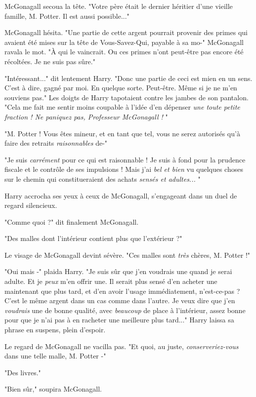 McGonagall secoua la tête. "Votre père était le dernier héritier d'une vieille famille, M. Potter. Il est aussi possible..."

McGonagall hésita. "Une partie de cette argent pourrait provenir des primes qui avaient été mises sur la tête de Vous-Savez-Qui, payable à sa mo-" McGonagall ravala le mot. "À qui le vaincrait. Ou ces primes n'ont peut-être pas encore été récoltées. Je ne suis pas sûre."

"Intéressant..." dit lentement Harry. "Donc une partie de ceci est mien en un sens. C'est à dire, gagné par moi. En quelque sorte. Peut-être. Même si je ne m'en souviens pas." Les doigts de Harry tapotaient contre les jambes de son pantalon. "Cela me fait me sentir moins coupable à l'idée d'en dépenser \emph{une toute petite fraction ! Ne paniquez pas, Professeur McGonagall !} "

"M. Potter ! Vous êtes mineur, et en tant que tel, vous ne serez autorisés qu'à faire des retraits \emph{raisonnables } de-"

"Je suis \emph{carrément}  pour ce qui est raisonnable ! Je suis à fond pour la prudence fiscale et le contrôle de ses impulsions ! Mais j'ai \emph{bel et bien}  vu quelques choses sur le chemin qui constitueraient des achats \emph{sensés et adultes...} "

Harry accrocha ses yeux à ceux de McGonagall, s'engageant dans un duel de regard silencieux.

"Comme quoi ?" dit finalement McGonagall.

"Des malles dont l'intérieur contient plus que l'extérieur ?"

Le visage de McGonagall devint sévère. "Ces malles sont \emph{très}  chères, M. Potter !"

"Oui mais -" plaida Harry. "Je suis sûr que j'en voudrais une quand je serai adulte. Et je \emph{peux}  m'en offrir une. Il serait plus sensé d'en acheter une maintenant que plus tard, et d'en avoir l'usage immédiatement, n'est-ce-pas ? C'est le même argent dans un cas comme dans l'autre. Je veux dire que j'en \emph{voudrais}  une de bonne qualité, avec \emph{beaucoup}  de place à l'intérieur, assez bonne pour que je n'ai pas à en racheter une meilleure plus tard..." Harry laissa sa phrase en suspens, plein d'espoir.

Le regard de McGonagall ne vacilla pas. "Et quoi, au juste, \emph{conserveriez-vous}  dans une telle malle, M. Potter -"

"Des livres."

"Bien sûr," soupira McGonagall.

